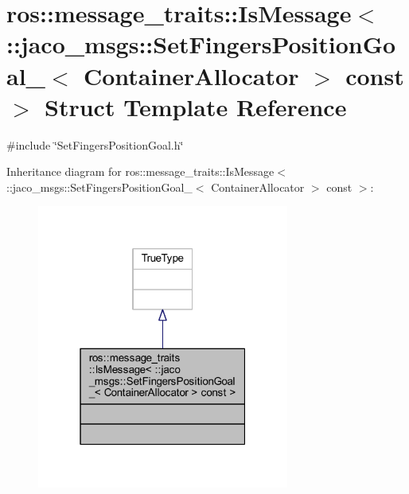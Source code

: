 \hypertarget{structros_1_1message__traits_1_1IsMessage_3_01_1_1jaco__msgs_1_1SetFingersPositionGoal___3_01Conff0af772d8e2093cfa12496dacee7772}{}\section{ros\+:\+:message\+\_\+traits\+:\+:Is\+Message$<$ \+:\+:jaco\+\_\+msgs\+:\+:Set\+Fingers\+Position\+Goal\+\_\+$<$ Container\+Allocator $>$ const $>$ Struct Template Reference}
\label{structros_1_1message__traits_1_1IsMessage_3_01_1_1jaco__msgs_1_1SetFingersPositionGoal___3_01Conff0af772d8e2093cfa12496dacee7772}


{\ttfamily \#include \char`\"{}Set\+Fingers\+Position\+Goal.\+h\char`\"{}}



Inheritance diagram for ros\+:\+:message\+\_\+traits\+:\+:Is\+Message$<$ \+:\+:jaco\+\_\+msgs\+:\+:Set\+Fingers\+Position\+Goal\+\_\+$<$ Container\+Allocator $>$ const $>$\+:
\nopagebreak
\begin{figure}[H]
\begin{center}
\leavevmode
\includegraphics[width=235pt]{da/d3f/structros_1_1message__traits_1_1IsMessage_3_01_1_1jaco__msgs_1_1SetFingersPositionGoal___3_01Condc49f8c83e71053c2050a93a77e18152}
\end{center}
\end{figure}


